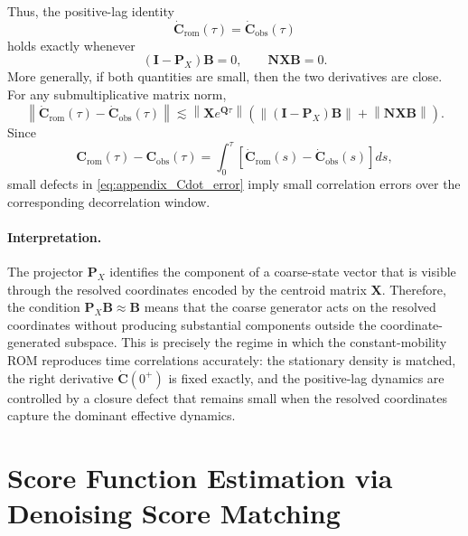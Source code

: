 \documentclass[%
  prl,
  reprint,
  amsmath,
  amssymb,
  aps
]{revtex4-2}
\begin{document}
Thus, the positive-lag identity
\[
\dot{\bm{C}}_{\mathrm{rom}}(\tau)=\dot{\bm{C}}_{\mathrm{obs}}(\tau)
\]
holds exactly whenever
\begin{equation}
    (\bm{I}-\bm{P}_X)\bm{B}=0,
    \qquad
    \bm{N}\bm{X}\bm{B}=0.
\label{eq:appendix_exact_conditions}
\end{equation}
More generally, if both quantities are small, then the two derivatives are close. For any submultiplicative matrix norm,
\begin{equation}
    \left\|
        \dot{\bm{C}}_{\mathrm{rom}}(\tau)-\dot{\bm{C}}_{\mathrm{obs}}(\tau)
    \right\|
    \lesssim
    \left\|
        \bm{X}e^{\bm{Q}\tau}
    \right\|
    \left(
        \left\|
            (\bm{I}-\bm{P}_X)\bm{B}
        \right\|
        +
        \left\|
            \bm{N}\bm{X}\bm{B}
        \right\|
    \right).
\label{eq:appendix_Cdot_bound}
\end{equation}
Since
\begin{equation}
    \bm{C}_{\mathrm{rom}}(\tau)-\bm{C}_{\mathrm{obs}}(\tau)
    =
    \int_0^\tau
    \left[
        \dot{\bm{C}}_{\mathrm{rom}}(s)-\dot{\bm{C}}_{\mathrm{obs}}(s)
    \right] ds,
\end{equation}
small defects in \eqref{eq:appendix_Cdot_error} imply small correlation errors over the corresponding decorrelation window.

\paragraph{Interpretation.}
The projector $\bm{P}_X$ identifies the component of a coarse-state vector that is visible through the resolved coordinates encoded by the centroid matrix $\bm{X}$. Therefore, the condition $\bm{P}_X\bm{B}\approx \bm{B}$ means that the coarse generator acts on the resolved coordinates without producing substantial components outside the coordinate-generated subspace. This is precisely the regime in which the constant-mobility ROM reproduces time correlations accurately: the stationary density is matched, the right derivative $\dot{\bm{C}}(0^+)$ is fixed exactly, and the positive-lag dynamics are controlled by a closure defect that remains small when the resolved coordinates capture the dominant effective dynamics.


\section{Score Function Estimation via Denoising Score Matching}
\label{appendix:score_estimation}
\end{document}
